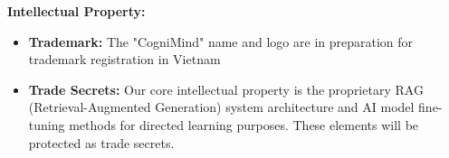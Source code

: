 \textbf{Intellectual Property:}
\begin{itemize}
    \item \textbf{Trademark:} The "CogniMind" name and logo are in preparation for trademark registration in Vietnam
    \item \textbf{Trade Secrets:} Our core intellectual property is the proprietary RAG (Retrieval-Augmented Generation) system architecture and AI model fine-tuning methods for directed learning purposes. These elements will be protected as trade secrets.
\end{itemize}
